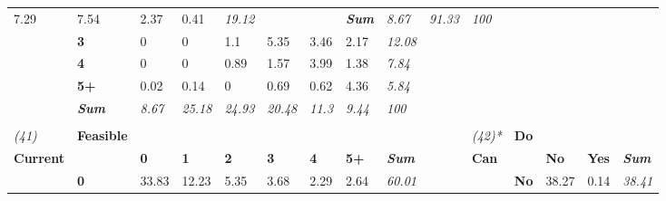 {\begin{center}
\begin{longtable}{lllllllllllllll}
  \cellcolor[HTML]{D5D5D5}7.29 &
  \cellcolor[HTML]{D3D3D3}7.54 &
  \cellcolor[HTML]{F2F2F2}2.37 &
  \cellcolor[HTML]{FDFDFD}0.41 &
  \textit{19.12} &
   &
   &
  \textit{\textbf{Sum}} &
  \textit{8.67} &
  \textit{91.33} &
  \textit{100} \\
 &
  \textbf{3} &
  \cellcolor[HTML]{FFFFFF}0 &
  \cellcolor[HTML]{FFFFFF}0 &
  \cellcolor[HTML]{F9F9F9}1.1 &
  \cellcolor[HTML]{E0E0E0}5.35 &
  \cellcolor[HTML]{EBEBEB}3.46 &
  \cellcolor[HTML]{F3F3F3}2.17 &
  \textit{12.08} &
   &
   &
   &
   &
   &
  \textit{} \\
 &
  \textbf{4} &
  \cellcolor[HTML]{FFFFFF}0 &
  \cellcolor[HTML]{FFFFFF}0 &
  \cellcolor[HTML]{FAFAFA}0.89 &
  \cellcolor[HTML]{F6F6F6}1.57 &
  \cellcolor[HTML]{E8E8E8}3.99 &
  \cellcolor[HTML]{F7F7F7}1.38 &
  \textit{7.84} &
   &
   &
   &
   &
   &
  \textit{} \\
 &
  \textbf{5+} &
  \cellcolor[HTML]{FFFFFF}0.02 &
  \cellcolor[HTML]{FFFFFF}0.14 &
  \cellcolor[HTML]{FFFFFF}0 &
  \cellcolor[HTML]{FBFBFB}0.69 &
  \cellcolor[HTML]{FCFCFC}0.62 &
  \cellcolor[HTML]{E6E6E6}4.36 &
  \textit{5.84} &
   &
   &
   &
   &
   &
  \textit{} \\
\textit{} &
  \textit{\textbf{Sum}} &
  \textit{8.67} &
  \textit{25.18} &
  \textit{24.93} &
  \textit{20.48} &
  \textit{11.3} &
  \textit{9.44} &
  \textit{100} &
  \textit{} &
  \textit{} &
  \textit{} &
  \textit{} &
  \textit{} &
  \textit{} \\
\textit{} &
  \textit{\textbf{}} &
  \textit{} &
  \textit{} &
  \textit{} &
  \textit{} &
  \textit{} &
  \textit{} &
  \textit{} &
  \textit{} &
  \textit{} &
  \textit{} &
  \textit{} &
  \textit{} &
  \textit{} \\
\textit{(41)} &
  \textbf{Feasible} &
   &
   &
   &
   &
   &
   &
  \textit{} &
   &
  \textit{(42)*} &
  \textbf{Do} &
   &
   &
  \textit{} \\
\textbf{Current} &
   &
  \textbf{0} &
  \textbf{1} &
  \textbf{2} &
  \textbf{3} &
  \textbf{4} &
  \textbf{5+} &
  \textit{\textbf{Sum}} &
  \textbf{} &
  \textbf{Can} &
   &
  \textbf{No} &
  \textbf{Yes} &
  \textit{\textbf{Sum}} \\
 &
  \textbf{0} &
  \cellcolor[HTML]{A6A6A6}33.83 &
  \cellcolor[HTML]{DFDFDF}12.23 &
  \cellcolor[HTML]{F1F1F1}5.35 &
  \cellcolor[HTML]{F6F6F6}3.68 &
  \cellcolor[HTML]{F9F9F9}2.29 &
  \cellcolor[HTML]{F9F9F9}2.64 &
  \textit{60.01} &
   &
   &
  \textbf{No} &
  \cellcolor[HTML]{AAAAAA}38.27 &
  \cellcolor[HTML]{FFFFFF}0.14 &
  \textit{38.41} \\

\end{longtable}
\end{center}}
